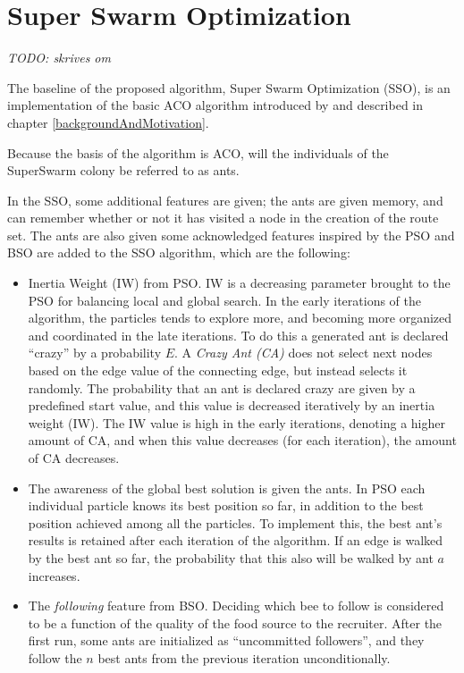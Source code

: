 \section{Super Swarm Optimization}

\emph{\color{blue} TODO: skrives om}

The baseline of the proposed algorithm, Super Swarm Optimization (SSO), is an implementation of the basic ACO algorithm introduced by \citet{nanda11} and described in chapter \vref{backgroundAndMotivation}. 


Because the basis of the algorithm is ACO, will the individuals of the SuperSwarm colony be referred to as ants. 


In the SSO, some additional features are given; the ants are given memory, and can remember whether or not it has visited a node in the creation of the route set. The ants are also given some acknowledged features inspired by the PSO and BSO are added to the SSO algorithm, which are the following:

\begin{itemize}
\item Inertia Weight (IW) from PSO. IW is a decreasing parameter brought to the PSO for balancing local and global search. In the early iterations of the algorithm, the particles tends to explore more, and becoming more organized and coordinated in the late iterations. To do this a generated ant is declared ``crazy'' by a probability $E$. A \textit{Crazy Ant (CA)} does not select next nodes based on the edge value of the connecting edge, but instead selects it randomly. The probability that an ant is declared crazy are given by a predefined start value, and this value is decreased iteratively by an inertia weight (IW). The IW value is high in the early iterations, denoting a higher amount of CA, and when this value decreases (for each iteration), the amount of CA decreases.
\item The awareness of the global best solution is given the ants. In PSO each individual particle knows its best position so far, in addition to the best position achieved among all the particles. To implement this, the best ant's results is retained after each iteration of the algorithm. If an edge is walked by the best ant so far, the probability that this also will be walked by ant $a$ increases.
\item The \textit{following} feature from BSO. Deciding which bee to follow is considered to be a function of the quality of the food source to the recruiter. After the first run, some ants are initialized as ``uncommitted followers'', and they follow the $n$ best ants from the previous iteration unconditionally.
\end{itemize}

